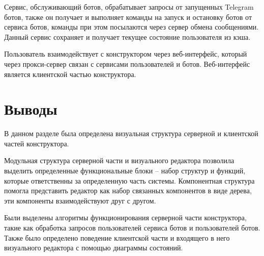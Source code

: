 Сервис, обслуживающий ботов, обрабатывает запросы от запущенных
Telegram ботов, также он получает и выполняет команды на запуск и
остановку ботов от сервиса ботов, команды при этом посылаются через сервер
обмена сообщениями. Данный сервис сохраняет и получает текущее состояние
пользователя из кэша.

Пользователь взаимодействует с конструктором через веб-интерфейс,
который через прокси-сервер связан с сервисами пользователей и ботов.
Веб-интерфейс является клиентской частью конструктора.





\section*{Выводы}

В данном разделе была определена визуальная структура серверной и клиентской
частей конструктора.

Модульная структура серверной части и визуального редактора позволила выделить определенные
функциональные блоки – набор структур и функций, которые
ответственны за определенную часть системы.
Компонентная структура
помогла представить редактор как набор связанных компонентов в виде
дерева, эти компоненты взаимодействуют друг с другом.

Были выделены алгоритмы функционирования серверной части конструктора, такие как
обработка запросов пользователей сервиса ботов и пользователей ботов.
Также было определено поведение клиентской части и входящего в
него визуального редактора с помощью диаграммы состояний.


